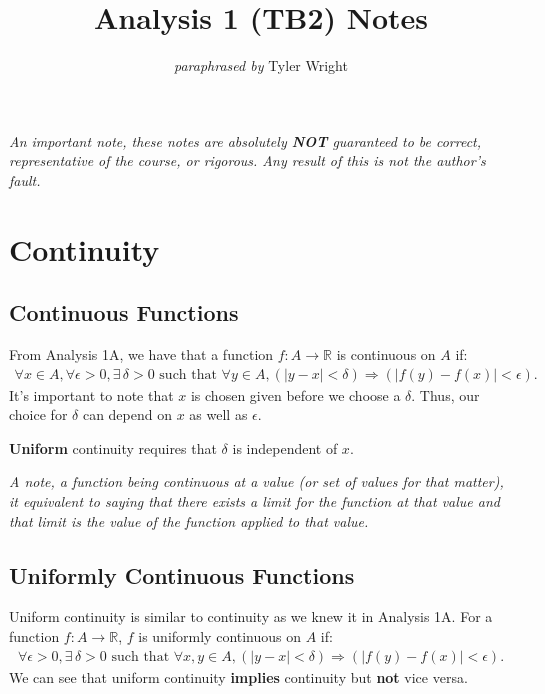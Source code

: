 \documentclass[a4paper, 12pt, twoside]{article}
\begin{document}
\title{Analysis 1 (TB2) Notes}
\date{}
\author{\textit{paraphrased by} Tyler Wright}
\maketitle

\vfill

\textit{An important note, these notes are absolutely \textbf{NOT}
      guaranteed to be correct, representative of the course, or rigorous.
      Any result of this is not the author's fault.}

\newpage

\section{Continuity}

\subsection{Continuous Functions}

From Analysis 1A, we have that a function $f: A \to \mathbb{R}$
is continuous on $A$ if:
\begin{align*}
      \forall x \in A, \forall \epsilon > 0, \exists\,\delta > 0
      \text{ such that } \forall y \in A,
      (|y - x| < \delta) \Rightarrow (|f(y) - f(x)| < \epsilon).
\end{align*}
It's important to note that $x$ is chosen given before we choose a
$\delta$. Thus, our choice for $\delta$ can depend on $x$ as well as
$\epsilon$.

\vspace{\baselineskip}

\textbf{Uniform} continuity requires that $\delta$ is independent of
$x$.

\vspace{\baselineskip}

\textit{A note, a function being continuous at a value (or set
      of values for that matter), it equivalent to saying that
      there exists a limit for the function at that value and that limit
      is the value of the function applied to that value.}

\subsection{Uniformly Continuous Functions}

Uniform continuity is similar to continuity as we knew it in Analysis
1A. For a function $f : A \to \mathbb{R}$, $f$ is uniformly continuous
on $A$ if:
\begin{align*}
      \forall \epsilon > 0, \exists\,\delta > 0
      \text{ such that } \forall x, y \in A,
      (|y - x| < \delta) \Rightarrow (|f(y) - f(x)| < \epsilon).
\end{align*}
We can see that uniform continuity \textbf{implies} continuity but
\textbf{not} vice versa.
\end{document}
